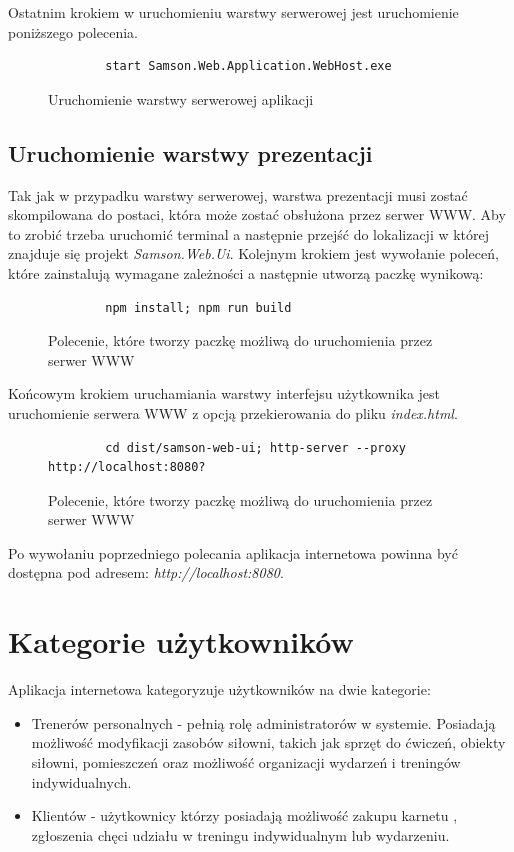 \documentclass[a4paper,twoside,12pt]{book}
\begin{document}
Ostatnim krokiem w uruchomieniu warstwy serwerowej jest uruchomienie poniższego polecenia.
\begin{figure} [H]
	\centering
	\begin{lstlisting}
		start Samson.Web.Application.WebHost.exe
	\end{lstlisting}
	\caption{Uruchomienie warstwy serwerowej aplikacji}
	\label{fig:aspNetRun}
\end{figure}

\subsection{Uruchomienie warstwy prezentacji}
Tak jak w przypadku warstwy serwerowej, warstwa prezentacji musi zostać skompilowana do postaci, która może zostać obsłużona przez serwer WWW. Aby to zrobić trzeba uruchomić terminal a następnie przejść do lokalizacji w której znajduje się projekt \textit{Samson.Web.Ui}. Kolejnym krokiem jest wywołanie poleceń, które zainstalują wymagane zależności a następnie utworzą paczkę wynikową:
\begin{figure} [H]
	\centering
	\begin{lstlisting}
		npm install; npm run build
	\end{lstlisting}
	\caption{Polecenie, które tworzy paczkę możliwą do uruchomienia przez serwer WWW}
	\label{fig:installAndBuildAngularProejct}
\end{figure}

Końcowym krokiem uruchamiania warstwy interfejsu użytkownika jest uruchomienie serwera WWW z opcją przekierowania do pliku \textit{index.html}.
\begin{figure} [H]
	\centering
	\begin{lstlisting}
		cd dist/samson-web-ui; http-server --proxy http://localhost:8080?
	\end{lstlisting}
	\caption{Polecenie, które tworzy paczkę możliwą do uruchomienia przez serwer WWW}
	\label{fig:runWWWServer}
\end{figure}

Po wywołaniu poprzedniego polecania aplikacja internetowa powinna być dostępna pod adresem: \textit{http://localhost:8080}.

\section {Kategorie użytkowników}

Aplikacja internetowa kategoryzuje użytkowników na dwie kategorie:
\begin{itemize}
	\item Trenerów personalnych - pełnią rolę administratorów w systemie. Posiadają możliwość modyfikacji zasobów siłowni, takich jak sprzęt do ćwiczeń, obiekty siłowni, pomieszczeń oraz możliwość organizacji wydarzeń i treningów indywidualnych.
	\item Klientów - użytkownicy którzy posiadają możliwość zakupu karnetu , zgłoszenia chęci udziału w treningu indywidualnym lub wydarzeniu.
\end{itemize}
\end{document}
